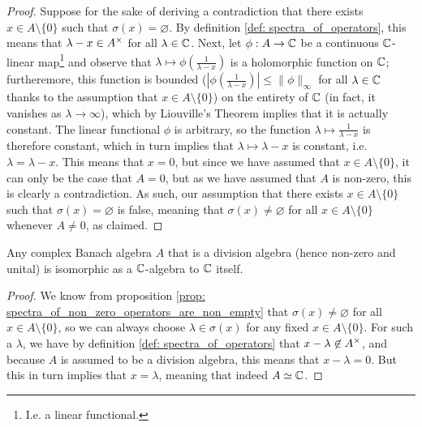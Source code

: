             \begin{proof}
                Suppose for the sake of deriving a contradiction that there exists $x \in A \setminus \{0\}$ such that $\sigma(x) = \varnothing$. By definition \ref{def: spectra_of_operators}, this means that $\lambda - x \in A^{\x}$ for all $\lambda \in \mathbb{C}$. Next, let $\phi: A \to \mathbb{C}$ be a continuous $\mathbb{C}$-linear map\footnote{I.e. a linear functional.} and observe that $\lambda \mapsto \phi\left(\frac{1}{\lambda - x}\right)$ is a holomorphic function on $\mathbb{C}$; furtheremore, this function is bounded ($\left|\phi\left(\frac{1}{\lambda - x}\right)\right| \leq \|\phi\|_{\infty}$ for all $\lambda \in \mathbb{C}$ thanks to the assumption that $x \in A \setminus \{0\}$) on the entirety of $\mathbb{C}$ (in fact, it vanishes as $\lambda \to \infty$), which by Liouville's Theorem implies that it is actually constant. The linear functional $\phi$ is arbitrary, so the function $\lambda \mapsto \frac{1}{\lambda - x}$ is therefore constant, which in turn implies that $\lambda \mapsto \lambda - x$ is constant, i.e. $\lambda = \lambda - x$. This means that $x = 0$, but since we have assumed that $x \in A \setminus \{0\}$, it can only be the case that $A = 0$, but as we have assumed that $A$ is non-zero, this is clearly a contradiction. As such, our assumption that there exists $x \in A \setminus \{0\}$ such that $\sigma(x) = \varnothing$ is false, meaning that $\sigma(x) \not = \varnothing$ for all $x \in A \setminus \{0\}$ whenever $A \not = 0$, as claimed.
            \end{proof}
        \begin{corollary} \label{coro: banach_division_algebras_are_isomorphic_to_ground_field}
            Any complex Banach algebra $A$ that is a division algebra (hence non-zero and unital) is isomorphic as a $\mathbb{C}$-algebra to $\mathbb{C}$ itself.
        \end{corollary}
            \begin{proof}
                We know from proposition \ref{prop: spectra_of_non_zero_operators_are_non_empty} that $\sigma(x) \not = \varnothing$ for all $x \in A \setminus \{0\}$, so we can always choose $\lambda \in \sigma(x)$ for any fixed $x \in A \setminus \{0\}$. For such a $\lambda$, we have by definition \ref{def: spectra_of_operators} that $x - \lambda \not \in A^{\x}$, and because $A$ is assumed to be a division algebra, this means that $x - \lambda = 0$. But this in turn implies that $x = \lambda$, meaning that indeed $A \simeq \mathbb{C}$.
            \end{proof}
